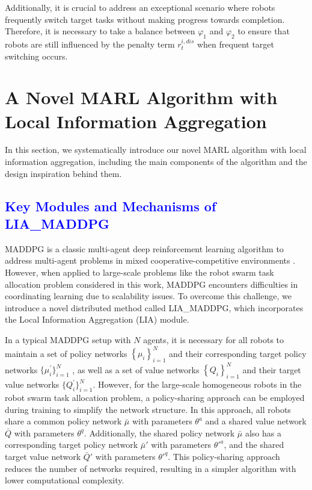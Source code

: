 \documentclass[lettersize,journal]{IEEEtran}
\newcommand{\blue}[1]{\textcolor{blue}{#1}}
\begin{document}
 Additionally, it is crucial to address an exceptional scenario where robots frequently switch target tasks without making progress towards completion. Therefore, it is necessary to take a balance  between $\varphi_1$ and $\varphi_2$ to ensure that robots are still influenced by the penalty term  $r_{t}^{i,dis}$  when frequent target switching occurs. 


\section{A Novel MARL Algorithm with Local Information Aggregation}\label{section3}
In this section, we systematically introduce our novel MARL algorithm with local information aggregation, including the main components of the algorithm and the design inspiration behind them.

\subsection{\blue{Key Modules and Mechanisms of LIA\_MADDPG}}\label{subsection a}
MADDPG is a classic multi-agent deep reinforcement learning algorithm  to address multi-agent problems in mixed cooperative-competitive environments \cite{lowe2017multi}. However, when applied to large-scale problems like the robot swarm task allocation problem considered in this work, MADDPG encounters difficulties in coordinating learning due to scalability issues. To overcome this challenge, we introduce a novel distributed method called LIA\_MADDPG, which incorporates the Local Information Aggregation (LIA) module. 

In a typical MADDPG setup with $N$ agents, it is  necessary for all robots  to maintain a set of policy networks $\left\{\mu_i\right\}_{i=1}^N$ and their corresponding target policy networks $\{\mu_{i}^{\prime}\}_{i=1}^{N}$ , as well as a set of value networks $\left\{Q_i\right\}_{i=1}^N$ and their target value networks $\{Q_{i}^{\prime}\}_{i=1}^{N}$. However, for the large-scale homogeneous robots in the robot swarm task allocation problem, a policy-sharing approach can be employed during training to simplify the network structure. In this approach, all robots share a common policy network  $\bar{\mu}$ with parameters $\theta^a$ and a shared value network  $\bar{Q}$ with parameters $\theta^q$. Additionally, the shared policy network $\bar{\mu}$ also has a corresponding target policy network $\bar{\mu}'$ with parameters $\theta'^a$, and the shared target value network $\bar{Q}'$ with parameters $\theta'^q$. This policy-sharing approach reduces the number of networks required, resulting in a simpler algorithm with lower computational complexity.  
\end{document}

